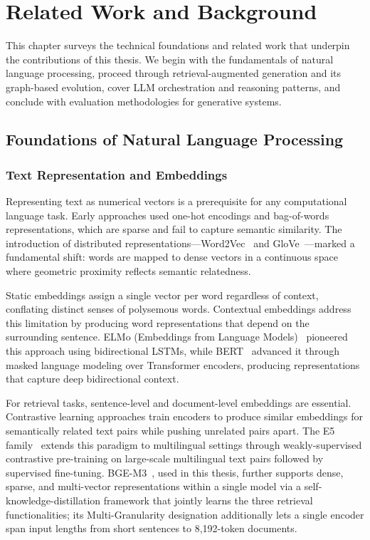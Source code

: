 \chapter{Related Work and Background}
\label{ch:related_work}

This chapter surveys the technical foundations and related work that underpin the contributions of this thesis. We begin with the fundamentals of natural language processing, proceed through retrieval-augmented generation and its graph-based evolution, cover LLM orchestration and reasoning patterns, and conclude with evaluation methodologies for generative systems.

\section{Foundations of Natural Language Processing}
\label{sec:rw:nlp}

\subsection{Text Representation and Embeddings}
\label{sec:rw:embeddings}

Representing text as numerical vectors is a prerequisite for any computational language task. Early approaches used one-hot encodings and bag-of-words representations, which are sparse and fail to capture semantic similarity. The introduction of distributed representations---Word2Vec~\cite{mikolov2013distributedrepresentationwordsphrases} and GloVe~\cite{pennington2014gloveglobalvectorsword}---marked a fundamental shift: words are mapped to dense vectors in a continuous space where geometric proximity reflects semantic relatedness.

Static embeddings assign a single vector per word regardless of context, conflating distinct senses of polysemous words. Contextual embeddings address this limitation by producing word representations that depend on the surrounding sentence. ELMo (Embeddings from Language Models)~\cite{peters2018deepcontextualizedwordrepresentations} pioneered this approach using bidirectional LSTMs, while BERT~\cite{devlin2019bertpretrainingdeepbidirectional} advanced it through masked language modeling over Transformer encoders, producing representations that capture deep bidirectional context.

For retrieval tasks, sentence-level and document-level embeddings are essential. Contrastive learning approaches train encoders to produce similar embeddings for semantically related text pairs while pushing unrelated pairs apart. The E5 family~\cite{wang2024multilinguale5textembeddings} extends this paradigm to multilingual settings through weakly-supervised contrastive pre-training on large-scale multilingual text pairs followed by supervised fine-tuning. BGE-M3~\cite{chen2024bgeM3embeddingmultilingualmultifunctionality}, used in this thesis, further supports dense, sparse, and multi-vector representations within a single model via a self-knowledge-distillation framework that jointly learns the three retrieval functionalities; its Multi-Granularity designation additionally lets a single encoder span input lengths from short sentences to 8{,}192-token documents.

